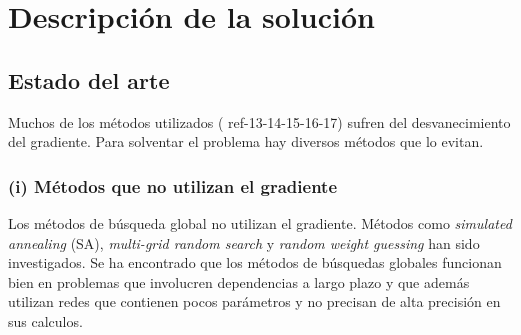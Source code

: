 \section{Descripción de la solución}
\begin{comment}
En la presente sección se describe el estado del arte y las características de la solución. Se explicara cual es el propósito de la solución, y posteriormente los alcances y limitaciones establecidas.
\end{comment}

\subsection{Estado del arte}
Muchos de los métodos utilizados (\cite{Elman1990, Schmidhuber1992b, Pearlmutter1989, Pearlmutter1995} ref-13-14-15-16-17) sufren del desvanecimiento del gradiente. Para solventar el problema hay diversos métodos que lo evitan.






\subsubsection{(i) Métodos que no utilizan el gradiente}
Los métodos de búsqueda global no utilizan el gradiente. Métodos como {\em simulated annealing} (SA), {\em multi-grid random search} \cite{Bengio1994} y {\em random weight guessing} \cite{Schmidhuber1996} han sido investigados. Se ha encontrado que los métodos de búsquedas globales funcionan bien en problemas que involucren dependencias a largo plazo y que además utilizan redes que contienen pocos parámetros y no precisan de alta precisión en sus calculos.

